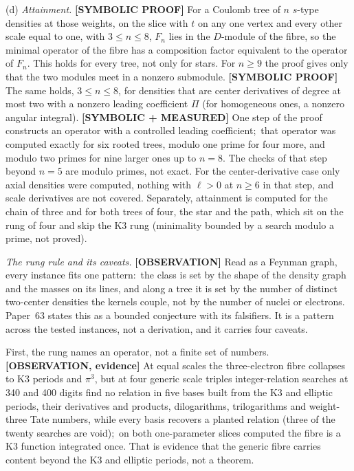 \documentclass[aps,pra,twocolumn,superscriptaddress,longbibliography]{revtex4-2}
\begin{document}
(d) \emph{Attainment.}  \textbf{[SYMBOLIC PROOF]} For a Coulomb tree of
$n$ $s$-type densities at those weights, on the slice with $t$ on any one
vertex and every other scale equal to one, with $3\le n\le8$, $F_n$ lies
in the $D$-module of the fibre, so the minimal operator of the fibre has
a composition factor equivalent to the operator of $F_n$.  This holds for
every tree, not only for stars.  For $n\ge9$ the proof gives only that
the two modules meet in a nonzero submodule.  \textbf{[SYMBOLIC PROOF]}
The same holds, $3\le n\le8$, for densities that are center derivatives
of degree at most two with a nonzero leading coefficient $\Pi$ (for
homogeneous ones, a nonzero angular integral).
\textbf{[SYMBOLIC + MEASURED]} One step of the proof constructs an
operator with a controlled leading coefficient;\ that operator was
computed exactly for six rooted trees, modulo one prime for four more,
and modulo two primes for nine larger ones up to $n=8$.  The checks of
that step beyond $n=5$ are modulo primes, not exact.  For the
center-derivative case only axial densities were computed, nothing
with $\ell>0$ at $n\ge6$ in that step, and scale derivatives are not
covered.  Separately, attainment is computed for the chain of three and
for both trees of four, the star and the path, which sit on the rung of
four and skip the K3 rung (minimality bounded by a search modulo a prime,
not proved).

\emph{The rung rule and its caveats.}  \textbf{[OBSERVATION]} Read as a
Feynman graph, every instance fits one pattern:\ the class is set by the
shape of the density graph and the masses on its lines, and along a tree
it is set by the number of distinct two-center densities the kernels
couple, not by the number of nuclei or electrons.  Paper~63 states this
as a bounded conjecture with its falsifiers.  It is a pattern across the
tested instances, not a derivation, and it carries four caveats.

First, the rung names an operator, not a finite set of numbers.
\textbf{[OBSERVATION, evidence]} At equal scales the three-electron
fibre collapses to K3 periods and $\pi^3$, but at four generic scale
triples integer-relation searches at 340 and 400 digits find no relation
in five bases built from the K3 and elliptic periods, their derivatives
and products, dilogarithms, trilogarithms and weight-three Tate numbers,
while every basis recovers a planted relation (three of
the twenty searches are void);\ on both one-parameter
slices computed the fibre is a K3 function integrated once.  That is
evidence that the generic fibre carries content beyond the K3 and
elliptic periods, not a theorem.
\end{document}
